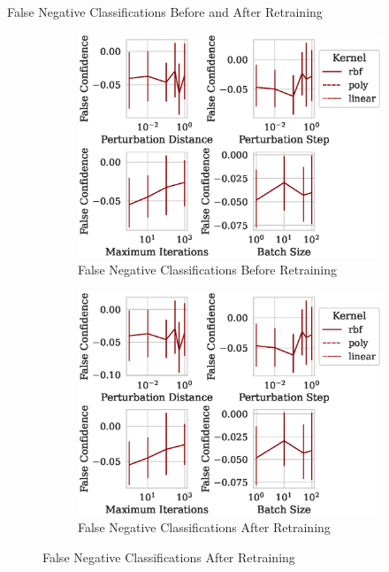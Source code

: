 \documentclass{beamer}
\begin{document}
\begin{frame}{False Negative Classifications Before and After Retraining}
  \begin{figure}
    \centering
    \begin{subfigure}[b]{0.45\textwidth}
      \centering
      \includegraphics[width=\textwidth]{./generated/confidence_vs_attack_parameters.eps}
      \caption{False Negative Classifications Before Retraining}
    \end{subfigure}
    \centering
    \begin{subfigure}[b]{0.45\textwidth}
      \centering
      \includegraphics[width=\textwidth]{./generated/retrain_confidence_vs_attack_parameters.eps}
      \caption{False Negative Classifications After Retraining}
    \end{subfigure}
  \end{figure}
\end{frame}
\end{document}
